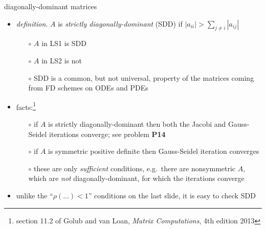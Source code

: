 \documentclass[10pt,hyperref]{beamer}
\begin{document}
\begin{frame}{diagonally-dominant matrices}

\begin{itemize}
\item \emph{definition}.  $A$ is \emph{strictly diagonally-dominant} (SDD) if $|a_{ii}| > \sum_{j\ne i} |a_{ij}|$
  \begin{itemize}
  \item[$\circ$] $A$ in LS1 is SDD
  \item[$\circ$] $A$ in LS2 is not
  \item[$\circ$] SDD is a common, but not universal, property of the matrices coming from FD schemes on ODEs and PDEs
  \end{itemize}

\item facts:\footnote{section 11.2 of Golub and van Loan, \emph{Matrix Computations}, 4th edition 2013}
  \begin{itemize}
  \item[$\circ$] if $A$ is strictly diagonally-dominant then both the Jacobi and Gauss-Seidel iterations converge; see problem \textbf{P14} 
  \item[$\circ$] if $A$ is symmetric positive definite then Gauss-Seidel iteration converges
  \item[$\circ$] these are only \emph{sufficient} conditions, e.g.~there are nonsymmetric $A$, which are \emph{not} diagonally-dominant, for which the iterations converge
  \end{itemize}
\item unlike the ``$\rho(\dots) < 1$'' conditions on the last slide, it is easy to check SDD
\end{itemize}
\end{frame}
\end{document}

